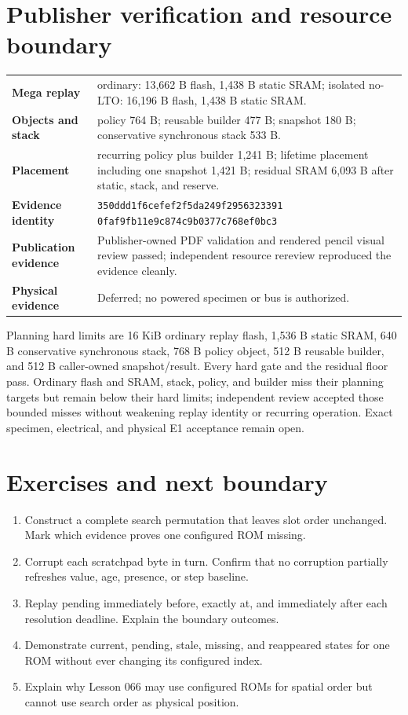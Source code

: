 \documentclass[10pt]{article}
\begin{document}
\section{Publisher verification and resource boundary}
\begin{tabularx}{\linewidth}{@{}>{\bfseries}l X@{}}
Mega replay & ordinary: 13,662 B flash, 1,438 B static SRAM; isolated no-LTO:
16,196 B flash, 1,438 B static SRAM.\\
Objects and stack & policy 764 B; reusable builder 477 B; snapshot 180 B;
conservative synchronous stack 533 B.\\
Placement & recurring policy plus builder 1,241 B; lifetime placement including
one snapshot 1,421 B; residual SRAM 6,093 B after static, stack, and reserve.\\
Evidence identity & \texttt{350ddd1f6cefef2f5da249f2956323391}\newline
\texttt{0faf9fb11e9c874c9b0377c768ef0bc3}\\
Publication evidence & Publisher-owned PDF validation and rendered pencil
visual review passed; independent resource rereview reproduced the evidence
cleanly.\\
Physical evidence & Deferred; no powered specimen or bus is authorized.\\
\end{tabularx}

Planning hard limits are 16 KiB ordinary replay flash, 1,536 B static SRAM,
640 B conservative synchronous stack, 768 B policy object, 512 B reusable
builder, and 512 B caller-owned snapshot/result. Every hard gate and the
residual floor pass. Ordinary flash and SRAM, stack, policy, and builder miss
their planning targets but remain below their hard limits; independent review
accepted those bounded misses without weakening replay identity or recurring
operation. Exact specimen, electrical, and physical E1 acceptance remain open.

\section{Exercises and next boundary}
\begin{enumerate}
 \item Construct a complete search permutation that leaves slot order
       unchanged. Mark which evidence proves one configured ROM missing.
 \item Corrupt each scratchpad byte in turn. Confirm that no corruption
       partially refreshes value, age, presence, or step baseline.
 \item Replay pending immediately before, exactly at, and immediately after
       each resolution deadline. Explain the boundary outcomes.
 \item Demonstrate current, pending, stale, missing, and reappeared states for
       one ROM without ever changing its configured index.
 \item Explain why Lesson 066 may use configured ROMs for spatial order but
       cannot use search order as physical position.
\end{enumerate}
\end{document}
